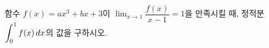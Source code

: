 함수 $f(x)=ax^3+bx+3$이 $\displaystyle\lim_{x\to 1}\dfrac{f(x)}{x-1}=1$을 만족시킬 때, 정적분 $\displaystyle\int_{0}^{1}f(x)\mkern3mu dx$의 값을 구하시오. 
